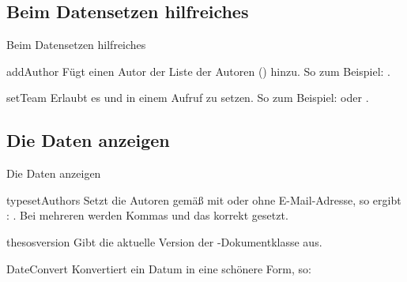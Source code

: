 \documentclass{sopra-seraphim}
\begin{document}
    \subsection{Beim Datensetzen hilfreiches}
    \begin{frame}[fragile]{Beim Datensetzen hilfreiches}
    \begin{command}{addAuthor}{}
        Fügt einen Autor der Liste der Autoren () hinzu. So zum
        Beispiel: .
    \end{command}

    \begin{command}{setTeam}{}
        Erlaubt es  und  in einem Aufruf zu setzen.
        So zum Beispiel:  oder
        .
    \end{command}
    \end{frame}


\subsection{Die Daten anzeigen}

\begin{frame}{Die Daten anzeigen}
    \begin{command}{typesetAuthors}{}
        Setzt die Autoren gemäß  mit oder
        ohne E-Mail-Adresse, so ergibt : \typesetAuthors.
        Bei mehreren werden Kommas und das  korrekt gesetzt.
    \end{command}

    \begin{command}{thesosversion}{}
        Gibt die aktuelle Version der -Dokumentklasse aus. 
    \end{command}

    \begin{command}{DateConvert}{}
        Konvertiert ein Datum in eine schönere Form, so:
    \begin{plainlatex}[morekeywords={[5]{\\DateConvert}}]
    \end{plainlatex}
    \end{command}
\end{frame}
\end{document}
